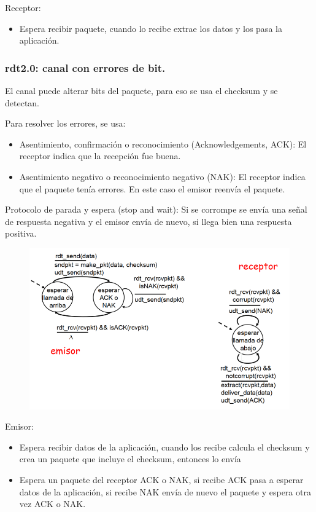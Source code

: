 \documentclass[12pt, twoside, openright]{report} %
\begin{document}
	  Receptor:

      \begin{itemize}
      \item
        Espera recibir paquete, cuando lo recibe extrae los datos y los
        pasa la aplicación.
      \end{itemize}
\subsubsection{rdt2.0: canal con errores de bit.}

      El canal puede alterar bits del paquete, para eso se usa el
      checksum y se detectan.

	  Para resolver los errores, se usa:

      \begin{itemize}
      \item
        Asentimiento, confirmación o reconocimiento (Acknowledgements,
        ACK): El receptor indica que la recepción fue buena.
      \item
        Asentimiento negativo o reconocimiento negativo (NAK): El
        receptor indica que el paquete tenía errores. En este caso el
        emisor reenvía el paquete.
      \end{itemize}

	  Protocolo de parada y espera (stop and wait): Si se corrompe se
      envía una señal de respuesta negativa y el emisor envía de nuevo,
      si llega bien una respuesta positiva.
	  \begin{figure}[H]
		{\includegraphics[scale=.45]{Untitled 11.png}}
	\end{figure}
	  Emisor:

      \begin{itemize}
      \item
        Espera recibir datos de la aplicación, cuando los recibe calcula
        el checksum y crea un paquete que incluye el checksum, entonces
        lo envía
      \item
        Espera un paquete del receptor ACK o NAK, si recibe ACK pasa a
        esperar datos de la aplicación, si recibe NAK envía de nuevo el
        paquete y espera otra vez ACK o NAK.
      \end{itemize}
\end{document}
